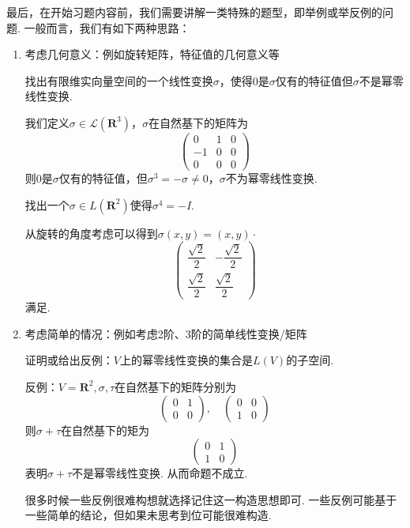 最后，在开始习题内容前，我们需要讲解一类特殊的题型，即举例或举反例的问题. 一般而言，我们有如下两种思路：
\begin{enumerate}
    \item 考虑几何意义：例如旋转矩阵，特征值的几何意义等
          \begin{example}{}{}
              找出有限维实向量空间的一个线性变换$\sigma$，使得0是$\sigma$仅有的特征值但$\sigma$不是幂零线性变换.
          \end{example}
          \begin{solution}
            我们定义$\sigma\in\mathcal{L}({\mathbf{R}^3})$，$\sigma$在自然基下的矩阵为
            \[ \begin{pmatrix}
                0 & 1 & 0 \\
                -1 & 0 & 0 \\
                0 & 0 & 0
            \end{pmatrix} \]
            则$0$是$\sigma$仅有的特征值，但$\sigma^3=-\sigma\neq 0$，$\sigma$不为幂零线性变换.
          \end{solution}
          \begin{example}{}{}
              找出一个$\sigma\in L(\mathbf{R}^2)$使得$\sigma^4=-I$.
          \end{example}
          \begin{solution}
            从旋转的角度考虑可以得到$\sigma(x,y)=(x,y)\cdot$
            \[ \begin{pmatrix}
                \dfrac{\sqrt{2}}{2} & -\dfrac{\sqrt{2}}{2} \\[2ex]
                \dfrac{\sqrt{2}}{2} & \dfrac{\sqrt{2}}{2}
            \end{pmatrix} \]
            满足.
          \end{solution}
    \item 考虑简单的情况：例如考虑2阶、3阶的简单线性变换/矩阵
          \begin{example}{}{}
              证明或给出反例：$V$上的幂零线性变换的集合是$L(V)$的子空间.
          \end{example}
          \begin{solution}
            反例：$V=\mathbf{R}^2,\sigma,\tau$在自然基下的矩阵分别为
            \[ \begin{pmatrix}
                0 & 1 \\
                0 & 0
            \end{pmatrix}, \quad
            \begin{pmatrix}
                0 & 0 \\
                1 & 0
            \end{pmatrix}\]
            则$\sigma+\tau$在自然基下的矩为
            \[ \begin{pmatrix}
                0 & 1 \\
                1 & 0
            \end{pmatrix} \]
            表明$\sigma+\tau$不是幂零线性变换. 从而命题不成立.
          \end{solution}
          很多时候一些反例很难构想就选择记住这一构造思想即可. 一些反例可能基于一些简单的结论，但如果未思考到位可能很难构造.
\end{enumerate}

